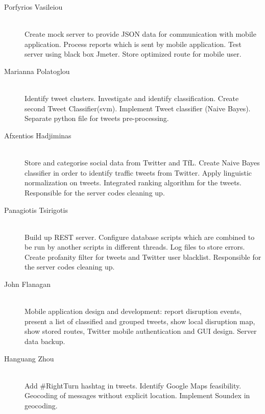 \begin{description}
  \item[Porfyrios Vasileiou] \hfill \\
  Create mock server to provide JSON data for
  communication with mobile application. Process reports which is sent by mobile application. Test
  server using black box Jmeter. Store optimized route for mobile user.

  \item[Marianna Polatoglou] \hfill \\
  Identify tweet clusters. Investigate and identify
  classification. Create second Tweet Classifier(svm). Implement Tweet classifier (Naive Bayes). Separate python file for tweets pre-processing.

  \item[Afxentios Hadjiminas] \hfill \\
  Store and categorise social data from Twitter and TfL. Create Naive Bayes classifier in order to identify traffic tweets from Twitter. Apply linguistic normalization on tweets. Integrated ranking algorithm for the tweets. Responsible for the server codes cleaning up.

  \item[Panagiotis Tsirigotis] \hfill \\
  Build up REST server. Configure database scripts which are combined to be run by another scripts in different threads. Log files to store errors. Create profanity filter for tweets and Twitter user
  blacklist. Responsible for the server codes cleaning up.

  \item[John Flanagan] \hfill \\
  Mobile application design and development: report disruption
  events, present a list of classified and grouped tweets, show local
  disruption map, show stored routes, Twitter mobile authentication and GUI design. Server data backup.

  \item[Hanguang Zhou] \hfill \\
  Add \#RightTurn hashtag in tweets.
  Identify Google Maps feasibility.
  Geocoding of messages without explicit location.
  Implement Soundex in geocoding.
\end{description}

